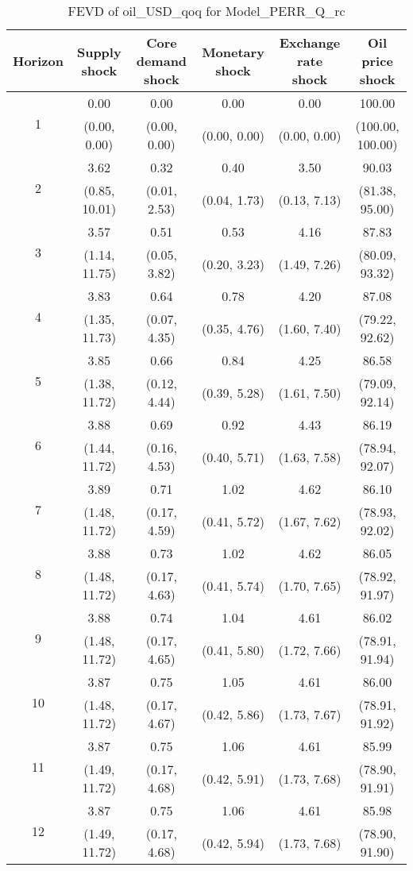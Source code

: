 \documentclass{article}
\begin{document}
\begin{table}
	\footnotesize
	\caption{FEVD of oil_USD_qoq for Model_PERR_Q_rc}
	\begin{tabular}{cccccc}
		Horizon & Supply shock & Core demand shock & Monetary shock & Exchange rate shock & Oil price shock\\ \hline
		\multirow{2}{*}{1} & 0.00 & 0.00 & 0.00 & 0.00 & 100.00\\
		 & (0.00, 0.00) & (0.00, 0.00) & (0.00, 0.00) & (0.00, 0.00) & (100.00, 100.00)\\
		\multirow{2}{*}{2} & 3.62 & 0.32 & 0.40 & 3.50 & 90.03\\
		 & (0.85, 10.01) & (0.01, 2.53) & (0.04, 1.73) & (0.13, 7.13) & (81.38, 95.00)\\
		\multirow{2}{*}{3} & 3.57 & 0.51 & 0.53 & 4.16 & 87.83\\
		 & (1.14, 11.75) & (0.05, 3.82) & (0.20, 3.23) & (1.49, 7.26) & (80.09, 93.32)\\
		\multirow{2}{*}{4} & 3.83 & 0.64 & 0.78 & 4.20 & 87.08\\
		 & (1.35, 11.73) & (0.07, 4.35) & (0.35, 4.76) & (1.60, 7.40) & (79.22, 92.62)\\
		\multirow{2}{*}{5} & 3.85 & 0.66 & 0.84 & 4.25 & 86.58\\
		 & (1.38, 11.72) & (0.12, 4.44) & (0.39, 5.28) & (1.61, 7.50) & (79.09, 92.14)\\
		\multirow{2}{*}{6} & 3.88 & 0.69 & 0.92 & 4.43 & 86.19\\
		 & (1.44, 11.72) & (0.16, 4.53) & (0.40, 5.71) & (1.63, 7.58) & (78.94, 92.07)\\
		\multirow{2}{*}{7} & 3.89 & 0.71 & 1.02 & 4.62 & 86.10\\
		 & (1.48, 11.72) & (0.17, 4.59) & (0.41, 5.72) & (1.67, 7.62) & (78.93, 92.02)\\
		\multirow{2}{*}{8} & 3.88 & 0.73 & 1.02 & 4.62 & 86.05\\
		 & (1.48, 11.72) & (0.17, 4.63) & (0.41, 5.74) & (1.70, 7.65) & (78.92, 91.97)\\
		\multirow{2}{*}{9} & 3.88 & 0.74 & 1.04 & 4.61 & 86.02\\
		 & (1.48, 11.72) & (0.17, 4.65) & (0.41, 5.80) & (1.72, 7.66) & (78.91, 91.94)\\
		\multirow{2}{*}{10} & 3.87 & 0.75 & 1.05 & 4.61 & 86.00\\
		 & (1.48, 11.72) & (0.17, 4.67) & (0.42, 5.86) & (1.73, 7.67) & (78.91, 91.92)\\
		\multirow{2}{*}{11} & 3.87 & 0.75 & 1.06 & 4.61 & 85.99\\
		 & (1.49, 11.72) & (0.17, 4.68) & (0.42, 5.91) & (1.73, 7.68) & (78.90, 91.91)\\
		\multirow{2}{*}{12} & 3.87 & 0.75 & 1.06 & 4.61 & 85.98\\
		 & (1.49, 11.72) & (0.17, 4.68) & (0.42, 5.94) & (1.73, 7.68) & (78.90, 91.90)\\
	\end{tabular}
\label{tab:fevd-Model_PERR_Q_rc-oil_USD_qoq}
\end{table}
\end{document}
